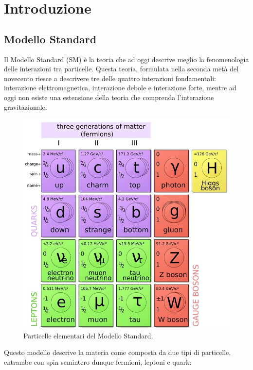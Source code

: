 \chapter{Introduzione}

\section{Modello Standard}
Il Modello Standard (SM) è la teoria che ad oggi descrive meglio la fenomenologia delle interazioni tra particelle. Questa teoria, formulata nella seconda metà del novecento riesce a descrivere tre delle quattro interazioni fondamentali: interazione elettromagnetica, interazione debole e interazione forte, mentre ad oggi non esiste una estensione della teoria che comprenda l'interazione gravitazionale.

\begin{figure}
\centering
\includegraphics[scale=0.3]{Immagini/SM}
\caption{Particelle elementari del Modello Standard.}
\label{fig:SM}
\end{figure}

Questo modello descrive la materia come composta da due tipi di particelle, entrambe con spin semintero dunque fermioni, leptoni e quark:

